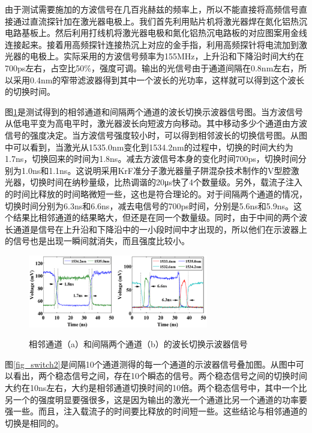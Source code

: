 \documentclass{ZJUthesis}
\begin{document}
由于测试需要施加的方波信号在几百兆赫兹的频率上，所以不能直接将高频信号直接通过直流探针加在激光器电极上。我们首先利用贴片机将激光器焊在氮化铝热沉电路基板上。然后利用打线机将激光器电极和氮化铝热沉电路板的对应图案用金线连接起来。接着用高频探针连接热沉上对应的金手指，利用高频探针将电流加到激光器的电极上。实际采用的方波信号频率为155MHz，上升沿和下降沿时间大约在700ps左右，占空比50\%，强度可调。输出的光信号由于通道间隔在0.8nm左右，所以采用0.4nm的窄带滤波器得到其中一个波长的光功率，这样就可以得到这个波长的切换时间。

图\ref{fig_switch}是测试得到的相邻通道和间隔两个通道的波长切换示波器信号图。当方波信号从低电平变为高电平时，激光器波长向短波方向移动。其中移动多少个通道由方波信号的强度决定。当方波信号强度较小时，可以得到相邻波长的切换信号图。从图中可以看到，当激光从1535.0nm变化到1534.2nm的过程中，切换的时间大约为1.7ns，切换回来的时间为1.8ns。减去方波信号本身的变化时间700ps，切换时间分别为1.0ns和1.1ns。这说明采用KrF准分子激光器量子阱混杂技术制作的V型腔激光器，切换时间在纳秒量级，比热调谐的20μs快了4个数量级。另外，载流子注入的时间比释放的时间略微短一些，这也是符合理论的。对于间隔两个通道的情况，切换时间分别为6.3ns和6.6ns，减去电信号的700ps时间，分别是5.6ns和5.9ns。这个结果比相邻通道的结果略大，但还是在同一个数量级。同时，由于中间的两个波长通道是信号在上升沿和下降沿中的一小段时间中才出现的，所以他们在示波器上的信号也是出现一瞬间就消失，而且强度比较小。

\begin{figure}[!ht]
  \centering
  \includegraphics[width=0.7\textwidth]{./Pictures/switch.eps}\\
  \caption{相邻通道（a）和间隔两个通道（b）的波长切换示波器信号}
  \label{fig_switch}
\end{figure}

图\ref{fig_switch2}是间隔10个通道测得的每一个通道的示波器信号叠加图。从图中可以看出，两个稳态信号之间，存在10个瞬态的信号。两个稳态信号之间的切换时间大约在10ns左右，大约是相邻通道切换时间的10倍。两个稳态信号中，其中一个比另一个的强度明显要强很多，这是因为输出的激光一个通道比另一个通道的功率要强一些。而且，注入载流子的时间要比释放的时间短一些。这些结论与相邻通道的切换是相同的。
\end{document}
